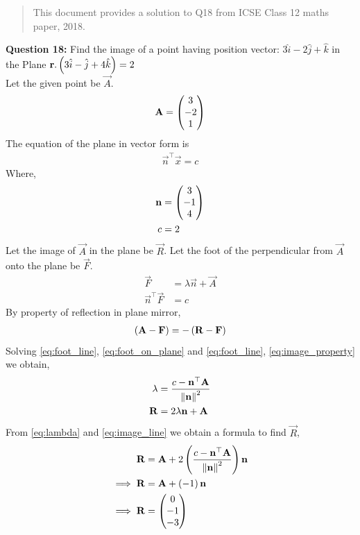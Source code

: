 \documentclass[journal,12pt,twocolumn]{IEEEtran}
\begin{document}
\begin{abstract}
This document provides a solution to Q18 from ICSE Class 12 maths paper, 2018.
\end{abstract}
\textbf{Question 18:}
Find the image of a point having position vector: $3\hat{i} - 2\hat{j} + \hat{k}$
in the Plane $\mathbf{r} . \left(3\hat{i} - \hat{j} + 4\hat{k} \right) = 2 $
\\
\solution
Let the given point be $\vec{A} $. 
\begin{align}
    \mathbf{A} = \begin{pmatrix}3 \\ -2 \\ 1\end{pmatrix}
    \label{eq:given_A}
\end{align}
The equation of the plane in vector form is
\begin{align}
    \vec{n}^{\top}\vec{x} = c
\end{align}
Where,
\begin{align}
    \mathbf{n} &= \begin{pmatrix}3 \\ -1 \\ 4\end{pmatrix}
    \label{eq:given_n}
    \\
    c &= 2
    \label{eq:given_c}
\end{align}
Let the image of  $\vec{A}$ in the plane be  $\vec{R}$. Let the foot of the perpendicular from $\vec{A}$ onto the plane be $\vec{F}$.
\begin{align}
    \vec{F} &= \lambda \vec{n} + \vec{A}
    \label{eq:foot_line}
    \\
    \vec{n}^{\top} \vec{F} &= c
    \label{eq:foot_on_plane}
\end{align}
By property of reflection in plane mirror,
\begin{align}
    \left(\mathbf{A} -\mathbf{F}\right) = -\left(\mathbf{R} -\mathbf{F}\right)
    \label{eq:image_property}    
\end{align}
Solving \eqref{eq:foot_line}, \eqref{eq:foot_on_plane} and \eqref{eq:foot_line}, \eqref{eq:image_property} we obtain,
\begin{align}
	\lambda &= \frac{ c-\mathbf{n}^{\top}\mathbf{A} } { \left\lVert\mathbf{n}\right\rVert^2} 
    \label{eq:lambda}
    \\
    \mathbf{R} &= 2\lambda \mathbf{n} + \mathbf{A}
    \label{eq:image_line}
\end{align}
From \eqref{eq:lambda} and  \eqref{eq:image_line} we obtain a formula to find $\vec{R}$,
\begin{align}
	\mathbf{R} &= \mathbf{A} + 2 
	\left(\frac{ c-\mathbf{n}^{\top}\mathbf{A} } { \left\lVert\mathbf{n}\right\rVert^2} \right) \mathbf{n}
    \label{eq:reflection_formula}
    \\
    \implies	\mathbf{R} &= \mathbf{A} + \left(-1\right) \mathbf{n}
	\\
	\implies
	\mathbf{R} &= \begin{pmatrix}0 \\ -1 \\ -3\end{pmatrix}
\end{align}
\end{document}
